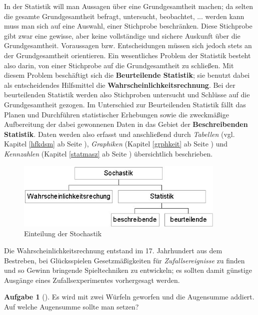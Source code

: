 \documentclass[a4paper, twoside, parskip, 10pt, smallheadings]{scrbook}
\theoremstyle{plain}
\theoremstyle{definition}
\newtheorem{Auf}{Aufgabe}%
\newenvironment{fshaded}{%
\def\FrameCommand{\fcolorbox{framecolor}{shadecolor}}%
\MakeFramed {\FrameRestore}}%
{\endMakeFramed}
\newenvironment{fauf}[1][]{\definecolor{shadecolor}{rgb}{.58,.788,1}%
\definecolor{framecolor}{rgb}{.13,.25,.9}%
\begin{fshaded}\begin{Auf}[#1]}{\end{Auf}\end{fshaded}}
\newcommand{\ba}{\begin{fauf}}
\newcommand{\ea}{\end{fauf}}
\begin{document}
In der Statistik will man Aussagen über eine Grundgesamtheit machen; da selten die gesamte Grundgesamtheit befragt, untersucht, beobachtet, ... werden kann muss man sich auf eine Auswahl, einer Stichprobe beschränken. Diese
Stichprobe gibt zwar eine gewisse, aber keine vollst\"{a}ndige und sichere Auskunft \"{u}ber die
Grundgesamtheit. Voraussagen bzw. Entscheidungen m\"{u}ssen sich jedoch stets an der
Grundgesamtheit orientieren. Ein wesentliches Problem der Statistik besteht also darin, von einer
Stichprobe auf die Grundgesamtheit zu schlie{\ss}en. Mit diesem Problem besch\"{a}ftigt sich die
{\bf Beurteilende Statistik}; sie benutzt dabei als entscheidendes Hilfsmittel die {\bf
Wahrscheinlichkeitsrechnung}. Bei der beurteilenden Statistik werden also Stichproben untersucht
und Schl\"{u}sse auf die Grundgesamtheit gezogen. Im Unterschied zur Beurteilenden Statistik
f\"{a}llt das Planen und Durchf\"{u}hren statistischer Erhebungen sowie die zweckm\"{a}{\ss}ige
Aufbereitung der dabei gewonnenen Daten in das Gebiet der {\bf Beschreibenden Statistik}. Daten werden also erfasst und anschließend durch {\it Tabellen} (vgl. Kapitel \ref{hfkdsm} ab Seite \pageref{hfkdsm}), {\it Graphiken} (Kapitel \ref{grphkeit} ab Seite \pageref{grphkeit}) und {\it Kennzahlen} (Kapitel \ref{statmasz} ab Seite \pageref{statmasz}) übersichtlich beschrieben.

  \begin{figure}[htb]
  \begin{center}
    \includegraphics[width=10cm]{2te/beschreibendestatistik/bilder/stochast.jpg}
  \caption{Einteilung der Stochastik}
  \end{center}
  \end{figure}



Die Wahrscheinlichkeitsrechnung entstand im 17.
Jahrhundert aus dem Bestreben, bei Gl\"{u}cksspielen Gesetzm\"{a}{\ss}igkeiten f\"{u}r {\it
Zufallsereignisse} zu finden und so Gewinn bringende Spieltechniken zu entwickeln; es sollten damit
g\"{u}nstige Ausg\"{a}nge eines Zufallsexperimentes vorhergesagt werden.

\ba \label{auf_augensumme} Es wird mit zwei W\"{u}rfeln geworfen und die Augensumme addiert. Auf
welche Augensumme sollte man setzen?\ea
\end{document}
